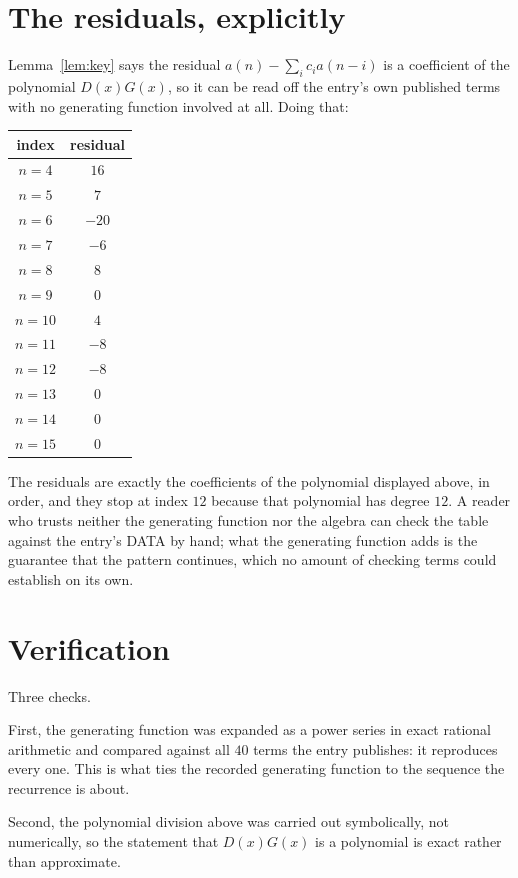 \documentclass[11pt,a4paper]{article}
\theoremstyle{plain}
\theoremstyle{definition}
\begin{document}
\section{The residuals, explicitly}

Lemma~\ref{lem:key} says the residual $a(n)-\sum_ic_ia(n-i)$ is a coefficient of the
polynomial $D(x)G(x)$, so it can be read off the entry's own published terms with no
generating function involved at all. Doing that:
\begin{center}
\begin{tabular}{cc}
index & residual \\ \hline
$n=4$ & $16$ \\
$n=5$ & $7$ \\
$n=6$ & $-20$ \\
$n=7$ & $-6$ \\
$n=8$ & $8$ \\
$n=9$ & $0$ \\
$n=10$ & $4$ \\
$n=11$ & $-8$ \\
$n=12$ & $-8$ \\
$n=13$ & $0$ \\
$n=14$ & $0$ \\
$n=15$ & $0$
\end{tabular}
\end{center}
The residuals are exactly the coefficients of the polynomial displayed above, in order, and
they stop at index $12$ because that polynomial has degree $12$. A reader who trusts
neither the generating function nor the algebra can check the table against the entry's DATA
by hand; what the generating function adds is the guarantee that the pattern continues, which
no amount of checking terms could establish on its own.

\section{Verification}

Three checks.

First, the generating function was expanded as a power series in exact rational arithmetic and
compared against all $40$ terms the entry publishes: it reproduces every one. This is
what ties the recorded generating function to the sequence the recurrence is about.

Second, the polynomial division above was carried out symbolically, not numerically, so the
statement that $D(x)G(x)$ is a polynomial is exact rather than approximate.
\end{document}
